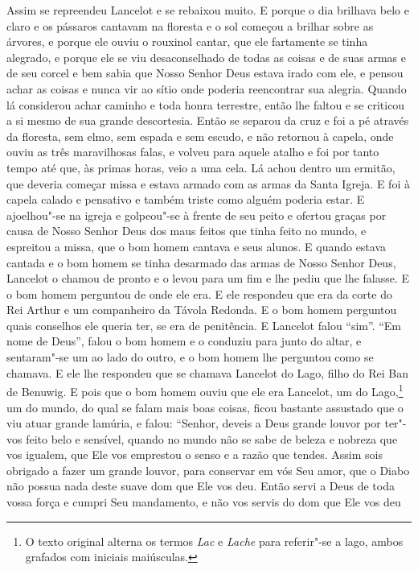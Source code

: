 Assim se repreendeu Lancelot e se rebaixou muito. E porque o dia brilhava belo
e claro e os pássaros cantavam na floresta e o sol começou a brilhar sobre as
árvores, e porque ele ouviu o rouxinol cantar, que ele fartamente se tinha
alegrado, e porque ele se viu desaconselhado de todas as coisas e de suas armas
e de seu corcel e bem sabia que Nosso Senhor Deus estava irado com ele, e
pensou achar as coisas e nunca vir ao sítio onde poderia reencontrar sua
alegria. Quando lá considerou achar caminho e toda honra terrestre,
então lhe faltou e se criticou a si mesmo de sua grande descortesia. 
Então se separou da cruz e foi a pé através da floresta, sem elmo, sem
espada e sem escudo, e não retornou à capela, onde ouviu as três maravilhosas
falas, e volveu para aquele atalho e foi por tanto tempo até que, às primas
horas, veio a uma cela. Lá achou dentro um ermitão, que deveria começar missa e
estava armado com as armas da Santa Igreja. E foi à capela calado e pensativo e
também triste como alguém poderia estar. E ajoelhou"-se na igreja e golpeou"-se à
frente de seu peito e ofertou graças por causa de Nosso Senhor Deus dos maus
feitos que tinha feito no mundo, e espreitou a missa, que o bom homem cantava e
seus alunos. E quando estava cantada e o bom homem se tinha desarmado das armas
de Nosso Senhor Deus, Lancelot o chamou de pronto e o levou para um fim e lhe
pediu que lhe falasse. E o bom homem perguntou de onde ele era. E ele respondeu
que era da corte do Rei Arthur e um companheiro da Távola Redonda. E o bom homem
perguntou quais conselhos ele queria ter, se era de penitência. E Lancelot
falou “sim”. “Em nome de Deus”, falou o bom homem e o conduziu para junto do
altar, e sentaram"-se um ao lado do outro, e o bom homem lhe perguntou como se
chamava. E ele lhe respondeu que se chamava Lancelot do Lago, filho do Rei Ban
de Benuwig. E pois que o bom homem ouviu que ele era Lancelot, um do
Lago,\footnote{ O texto original alterna os termos \textit{Lac }e \textit{Lache}
para referir"-se a lago, ambos grafados com iniciais maiúsculas.} 
um do mundo, do qual se falam mais boas coisas, ficou bastante assustado que o
viu atuar grande lamúria, e falou: “Senhor, deveis a Deus grande louvor por
ter"-vos feito belo e sensível, quando no mundo não se sabe de beleza e nobreza
que vos igualem, que Ele vos emprestou o senso e a razão que tendes. Assim sois
obrigado a fazer um grande louvor, para conservar em vós Seu amor,  que o Diabo
não possua nada deste suave dom que Ele vos deu. Então servi a Deus de toda
vossa força e cumpri Seu mandamento, e não vos servis do dom que Ele vos deu
